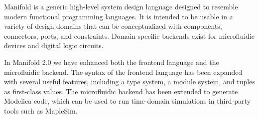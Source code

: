 Manifold is a generic high-level system design language designed to
resemble modern functional programming languages. 
%
It is intended to be usable in a variety of design domains that can be
conceptualized with components, connectors, ports, and constraints.
%
Domain-specific backends exist for microfluidic devices and digital
logic circuits.
%

In Manifold 2.0 we have enhanced both the frontend language and the
microfluidic backend.
%
The syntax of the frontend language has been expanded with several
useful features, including a type system, a module system, and
tuples as first-class values. 
%
The microfluidic backend has been extended to generate Modelica code,
which can be used to run time-domain simulations in third-party tools
such as MapleSim.


